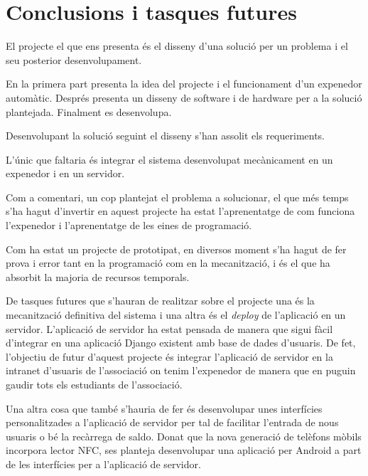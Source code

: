 \chapter{Conclusions i tasques futures}

El projecte el que ens presenta és el disseny d'una solució per un problema i el seu posterior desenvolupament.

En la primera part presenta la idea del projecte i el funcionament d'un expenedor automàtic. Després presenta un disseny de software i de hardware per a la solució plantejada. Finalment es desenvolupa.

Desenvolupant la solució seguint el disseny s'han assolit els requeriments.

L'únic que faltaria és integrar el sistema desenvolupat mecànicament en un expenedor i en un servidor.

Com a comentari, un cop plantejat el problema a solucionar, el que més temps s'ha hagut d'invertir en aquest projecte ha estat l'aprenentatge de com funciona l'expenedor i l'aprenentatge de les eines de programació.

Com ha estat un projecte de prototipat, en diversos moment s'ha hagut de fer prova i error tant en la programació com en la mecanització, i és el que ha absorbit la majoria de recursos temporals.

De tasques futures que s'hauran de realitzar sobre el projecte una és la mecanització definitiva del sistema i una altra és el \textit{deploy} de l'aplicació en un servidor. L'aplicació de servidor ha estat pensada de manera que sigui fàcil d'integrar en una aplicació Django existent amb base de dades d'usuaris. De fet, l'objectiu de futur d'aquest projecte és integrar l'aplicació de servidor en la intranet d'usuaris de l'associació on tenim l'expenedor de manera que en puguin gaudir tots els estudiants de l'associació.

Una altra cosa que també s'hauria de fer és desenvolupar unes interfícies personalitzades a l'aplicació de servidor per tal de facilitar l'entrada de nous usuaris o bé la recàrrega de saldo. Donat que la nova generació de telèfons mòbils incorpora lector NFC, ses planteja desenvolupar una aplicació per Android a part de les interfícies per a l'aplicació de servidor.